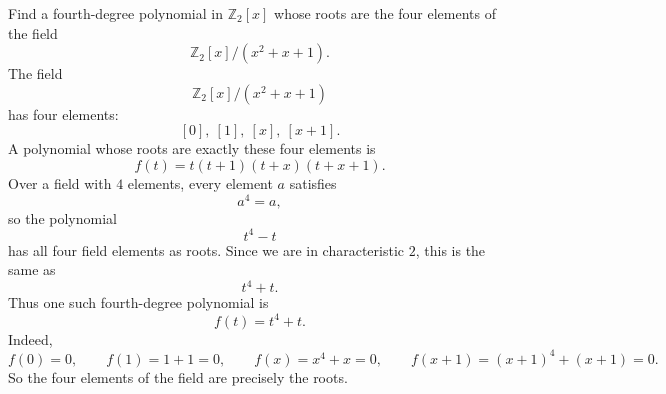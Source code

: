 \begin{problem}{
    Find a fourth-degree polynomial in $\mathbb{Z}_2[x]$ whose roots are the four elements of the field
    \[
        \mathbb{Z}_2[x]/(x^2+x+1).
    \]
}
    The field
    \[
        \mathbb{Z}_2[x]/(x^2+x+1)
    \]
    has four elements:
    \[
        [0],\ [1],\ [x],\ [x+1].
    \]
    A polynomial whose roots are exactly these four elements is
    \[
        f(t)=t(t+1)(t+x)(t+x+1).
    \]
    Over a field with $4$ elements, every element $a$ satisfies
    \[
        a^4=a,
    \]
    so the polynomial
    \[
        t^4-t
    \]
    has all four field elements as roots.
    Since we are in characteristic $2$, this is the same as
    \[
        t^4+t.
    \]
    Thus one such fourth-degree polynomial is
    \[
        f(t)=t^4+t.
    \]
    Indeed,
    \[
        f(0)=0,
        \qquad
        f(1)=1+1=0,
        \qquad
        f(x)=x^4+x=0,
        \qquad
        f(x+1)=(x+1)^4+(x+1)=0.
    \]
    So the four elements of the field are precisely the roots.
\end{problem}

